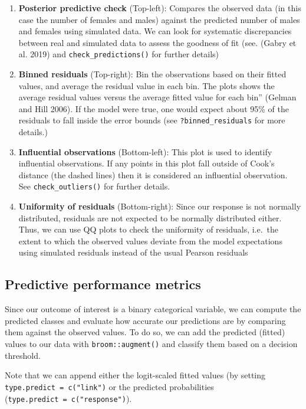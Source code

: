 \documentclass[
  letterpaper,
  DIV=11,
  numbers=noendperiod]{scrartcl}
\begin{document}
\begin{enumerate}
\def\labelenumi{\arabic{enumi}.}
\item
  \textbf{Posterior predictive check} (Top-left): Compares the observed
  data (in this case the number of females and males) against the
  predicted number of males and females using simulated data. We can
  look for systematic discrepancies between real and simulated data to
  assess the goodness of fit (see. (Gabry et al. 2019) and
  \texttt{check\_predictions()} for further details)
\item
  \textbf{Binned residuals} (Top-right): Bin the observations based on
  their fitted values, and average the residual value in each bin. The
  plots shows the average residual values versus the average fitted
  value for each bin'' (Gelman and Hill 2006). If the model were true,
  one would expect about 95\% of the residuals to fall inside the error
  bounds (see \texttt{?binned\_residuals} for more details.)
\item
  \textbf{Influential observations} (Bottom-left): This plot is used to
  identify influential observations. If any points in this plot fall
  outside of Cook's distance (the dashed lines) then it is considered an
  influential observation. See \texttt{check\_outliers()} for further
  details.
\item
  \textbf{Uniformity of residuals} (Bottom-right): Since our response is
  not normally distributed, residuals are not expected to be normally
  distributed either. Thus, we can use QQ plots to check the uniformity
  of residuals, i.e.~the extent to which the observed values deviate
  from the model expectations using simulated residuals instead of the
  usual Pearson residuals
\end{enumerate}

\subsection{Predictive performance
metrics}\label{predictive-performance-metrics}

Since our outcome of interest is a binary categorical variable, we can
compute the predicted classes and evaluate how accurate our predictions
are by comparing them against the observed values. To do so, we can add
the predicted (fitted) values to our data with \texttt{broom::augment()}
and classify them based on a decision threshold.

\begin{tcolorbox}[enhanced jigsaw, colframe=quarto-callout-note-color-frame, toprule=.15mm, toptitle=1mm, opacitybacktitle=0.6, breakable, colback=white, opacityback=0, title=\textcolor{quarto-callout-note-color}{\faInfo}\hspace{0.5em}{Note}, rightrule=.15mm, bottomrule=.15mm, coltitle=black, colbacktitle=quarto-callout-note-color!10!white, leftrule=.75mm, left=2mm, arc=.35mm, bottomtitle=1mm, titlerule=0mm]

Note that we can append either the logit-scaled fitted values (by
setting \texttt{type.predict\ =\ c("link")} or the predicted
probabilities (\texttt{type.predict\ =\ c("response")}).

\end{tcolorbox}
\end{document}
